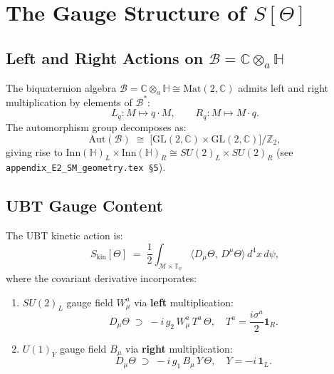 \documentclass[12pt,a4paper]{article}
\theoremstyle{definition}
\theoremstyle{remark}
\begin{document}
\section{The Gauge Structure of $S[\Theta]$}
\label{sec:gauge_structure}

\subsection{Left and Right Actions on $\mathcal{B} = \mathbb{C}\otimes_a\mathbb{H}$}
\label{subsec:LR_actions}

The biquaternion algebra $\mathcal{B} = \mathbb{C}\otimes_a\mathbb{H}
\cong \mathrm{Mat}(2,\mathbb{C})$ admits left and right multiplication
by elements of $\mathcal{B}^*$:
\begin{equation}
  L_q: M \mapsto q\cdot M, \qquad
  R_q: M \mapsto M\cdot q.
\end{equation}
The automorphism group decomposes as:
\begin{equation}
  \mathrm{Aut}(\mathcal{B})
  \;\cong\;
  \bigl[\mathrm{GL}(2,\mathbb{C}) \times \mathrm{GL}(2,\mathbb{C})\bigr]\big/\mathbb{Z}_2,
\end{equation}
giving rise to $\mathrm{Inn}(\mathbb{H})_L \times \mathrm{Inn}(\mathbb{H})_R
\cong SU(2)_L \times SU(2)_R$ (see \texttt{appendix\_E2\_SM\_geometry.tex~§5}).

\subsection{UBT Gauge Content}
\label{subsec:UBT_gauge}

The UBT kinetic action is:
\begin{equation}
  S_{\mathrm{kin}}[\Theta]
  \;=\; \frac{1}{2}\int_{\mathcal{M}\times\mathbb{T}_\psi}
         \bigl\langle D_\mu\Theta,\, D^\mu\Theta \bigr\rangle\,d^4x\,d\psi,
\end{equation}
where the covariant derivative incorporates:
\begin{enumerate}
  \item $SU(2)_L$ gauge field $W^a_\mu$ via \textbf{left} multiplication:
        \begin{equation}
          D_\mu\Theta \;\supset\; -i\,g_2\,W^a_\mu\,T^a\,\Theta,
          \quad T^a = \frac{i\sigma^a}{2}\mathbf{1}_R.
          \label{eq:SU2L_covariant}
        \end{equation}
  \item $U(1)_Y$ gauge field $B_\mu$ via \textbf{right} multiplication:
        \begin{equation}
          D_\mu\Theta \;\supset\; -i\,g_1\,B_\mu\,Y\,\Theta,
          \quad Y = -i\,\mathbf{1}_L.
          \label{eq:U1Y_covariant}
        \end{equation}
\end{enumerate}
\end{document}
